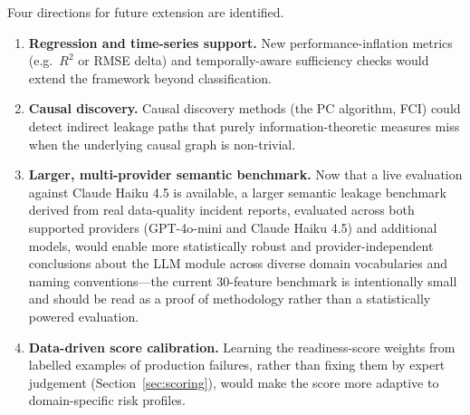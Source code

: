 \documentclass[12pt,a4paper]{report}
\begin{document}
Four directions for future extension are identified.

\begin{enumerate}[leftmargin=1.5em]
\item \textbf{Regression and time-series support.}  New performance-inflation metrics
  (e.g.\ $R^2$ or RMSE delta) and temporally-aware sufficiency checks would extend the
  framework beyond classification.
\item \textbf{Causal discovery.}  Causal discovery methods (the PC algorithm, FCI) could
  detect indirect leakage paths that purely information-theoretic measures miss when the
  underlying causal graph is non-trivial.
\item \textbf{Larger, multi-provider semantic benchmark.}  Now that a live evaluation
  against Claude Haiku 4.5 is available, a larger semantic leakage benchmark derived from
  real data-quality incident reports, evaluated across both supported providers (GPT-4o-mini
  and Claude Haiku 4.5) and additional models, would enable
  more statistically robust and provider-independent conclusions about the LLM module across
  diverse domain vocabularies and naming conventions---the current 30-feature benchmark is
  intentionally small and should be read as a proof of methodology rather than a
  statistically powered evaluation.
\item \textbf{Data-driven score calibration.}  Learning the readiness-score weights from
  labelled examples of production failures, rather than fixing them by expert judgement
  (Section~\ref{sec:scoring}), would make the score more adaptive to domain-specific risk
  profiles.
\end{enumerate}
\end{document}
